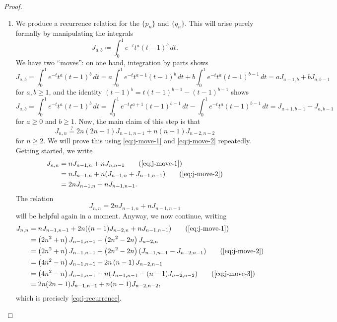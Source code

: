 \documentclass[../notes.tex]{subfiles}
\begin{document}
\begin{proof}
\begin{enumerate}
		\item We produce a recurrence relation for the $\{p_n\}$ and $\{q_n\}$. This will arise purely formally by manipulating the integrals
		\[J_{a,b}\coloneqq\int_0^1e^{-t}t^a(t-1)^b\,dt.\]
		We have two ``moves'': on one hand, integration by parts shows
		\begin{equation}
			J_{a,b}=\int_0^1e^{-t}t^a(t-1)^b\,dt=a\int_0^1e^{-t}t^{a-1}(t-1)^b\,dt+b\int_0^1e^{-t}t^a(t-1)^{b-1}\,dt=aJ_{a-1,b}+bJ_{a,b-1} \label{eq:j-move-1}
		\end{equation}
		for $a,b\ge1$, and the identity $(t-1)^b=t(t-1)^{b-1}-(t-1)^{b-1}$ shows
		\begin{equation}
			J_{a,b}=\int_0^1e^{-t}t^a(t-1)^b\,dt=\int_0^1e^{-t}t^{a+1}(t-1)^{b-1}\,dt-\int_0^1e^{-t}t^a(t-1)^{b-1}\,dt=J_{a+1,b-1}-J_{a,b-1} \label{eq:j-move-2}
		\end{equation}
		for $a\ge0$ and $b\ge1$. Now, the main claim of this step is that
		\begin{equation}
			J_{n,n}\stackrel?=2n(2n-1)J_{n-1,n-1}+n(n-1)J_{n-2,n-2} \label{eq:j-recurrence}
		\end{equation}
		for $n\ge2$. We will prove this using \eqref{eq:j-move-1} and \eqref{eq:j-move-2} repeatedly. Getting started, we write
		\begin{align*}
			J_{n,n} &= nJ_{n-1,n}+nJ_{n,n-1} \tag{\ref{eq:j-move-1}} \\
			&= nJ_{n-1,n}+n(J_{n-1,n}+J_{n-1,n-1}) \tag{\ref{eq:j-move-2}} \\
			&= 2nJ_{n-1,n}+nJ_{n-1,n-1}.
		\end{align*}
		The relation
		\begin{equation}
			J_{n,n} = 2nJ_{n-1,n}+nJ_{n-1,n-1} \label{eq:j-move-3}
		\end{equation}
		will be helpful again in a moment. Anyway, we now continue, writing
		\begin{align*}
			J_{n,n} &= nJ_{n-1,n-1}+2n((n-1)J_{n-2,n}+nJ_{n-1,n-1}) \tag{\ref{eq:j-move-1}} \\
			&= \left(2n^2+n\right)J_{n-1,n-1}+\left(2n^2-2n\right)J_{n-2,n} \\
			&= \left(2n^2+n\right)J_{n-1,n-1}+\left(2n^2-2n\right)(J_{n-1,n-1}-J_{n-2,n-1}) \tag{\ref{eq:j-move-2}} \\
			&= \left(4n^2-n\right)J_{n-1,n-1}-2n\left(n-1\right)J_{n-2,n-1} \\
			&= \left(4n^2-n\right)J_{n-1,n-1}-n(J_{n-1,n-1}-(n-1)J_{n-2,n-2}) \tag{\ref{eq:j-move-3}} \\
			&= 2n(2n-1)J_{n-1,n-1}+n(n-1)J_{n-2,n-2},
		\end{align*}
		which is precisely \eqref{eq:j-recurrence}.


\end{enumerate}
\end{proof}
\end{document}

